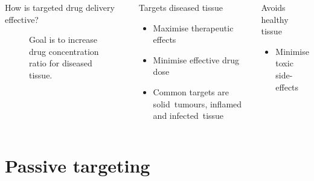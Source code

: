 \documentclass[aspectratio=169,compress]{beamer}
\newcommand*{\autotitle}{\subsecname\hfill\textbf{\small\secname}}
\begin{document}
\begin{frame}{\autotitle}
\begin{columns}
\begin{block}{How is targeted drug delivery effective?}
\begin{figure}
          \caption{Goal is to increase drug concentration ratio for diseased tissue.}
        \end{figure}
      \end{block}

      \begin{block}{Targets diseased tissue}
        \begin{itemize}
          \item Maximise therapeutic effects
          \item Minimise effective drug dose
          \item Common targets are \alert{solid~tumours}, \alert{inflamed} and \alert{infected~tissue}
        \end{itemize}
      \end{block}

      \begin{block}{Avoids healthy tissue}
        \begin{itemize}
          \item Minimise toxic side-effects
        \end{itemize}
      \end{block}

  \end{columns}
\end{frame}

\section{Passive targeting}
\end{document}
